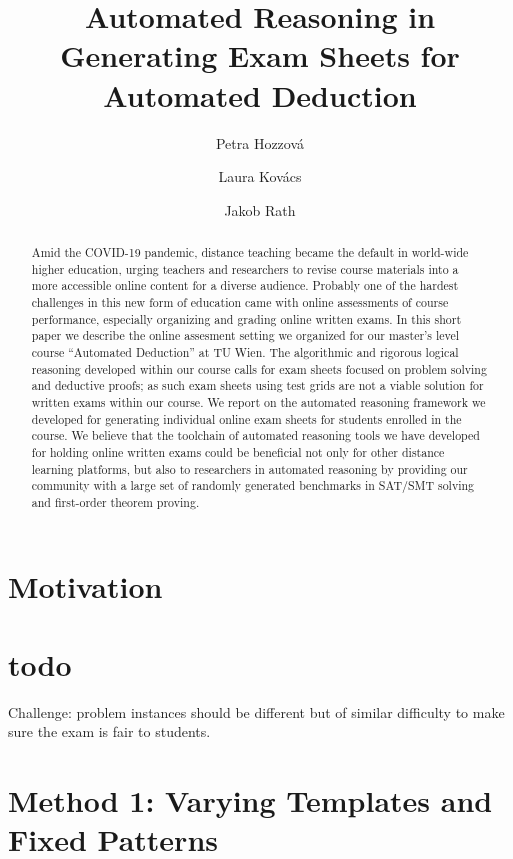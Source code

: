 \documentclass[12pt]{llncs}
\title{Automated Reasoning in Generating Exam Sheets for Automated Deduction}
\author{Petra Hozzov\'a\and
Laura Kov\'acs \and
Jakob Rath}
\institute{
    TU Wien, Austria
}
\begin{document}
\maketitle





\begin{abstract}
Amid the COVID-19 pandemic, distance teaching became the default in world-wide higher education,
urging teachers and researchers to revise course materials into a
more accessible online content for a diverse audience. Probably one of the hardest challenges in this new form of education
came with online assessments of course performance, especially organizing and grading online written exams.
In this short paper we describe the online assesment
setting  we organized for our master's level course ``Automated
Deduction'' at TU Wien.
The algorithmic and rigorous logical reasoning developed within our
course calls for exam sheets focused on problem solving and deductive
proofs; as such exam sheets using test grids are not a viable solution
for written exams within our course.
We report on the automated reasoning framework we developed for generating individual online exam sheets for students enrolled in the course.
We believe that the toolchain of automated reasoning tools we have developed for holding online written exams could be beneficial not only for other distance learning platforms, but also to researchers in automated reasoning by providing our community with a large set of randomly generated benchmarks in SAT/SMT solving and first-order theorem proving.
\end{abstract}





\section{Motivation}





\section{todo}

Challenge:
problem instances should be different but of similar difficulty to make sure the exam is fair to students.





\section{Method 1: Varying Templates and Fixed Patterns}
\end{document}
